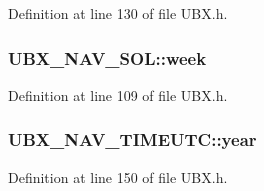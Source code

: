 Definition at line 130 of file U\-B\-X.\-h.

\hypertarget{group___g_s_p_module_gaceeb9bd043b85b904f3a3bcfd1c2dc38}{
\subsubsection[{week}]{ U\-B\-X\-\_\-\-N\-A\-V\-\_\-\-S\-O\-L\-::week}}\label{group___g_s_p_module_gaceeb9bd043b85b904f3a3bcfd1c2dc38}


Definition at line 109 of file U\-B\-X.\-h.

\hypertarget{group___g_s_p_module_ga8ea81fa402795b3daf6ec8bcc9c51eb1}{
\subsubsection[{year}]{ U\-B\-X\-\_\-\-N\-A\-V\-\_\-\-T\-I\-M\-E\-U\-T\-C\-::year}}\label{group___g_s_p_module_ga8ea81fa402795b3daf6ec8bcc9c51eb1}


Definition at line 150 of file U\-B\-X.\-h.

